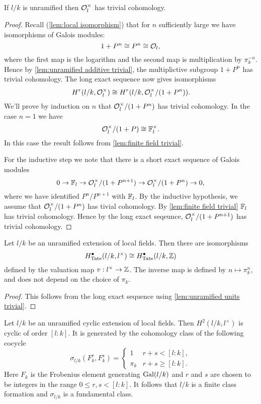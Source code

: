 \begin{lemma}	\label{lem:unramified units trivial}
	If $l/k$ is unramified then ${\mathcal O}_l^\times$ has trivial cohomology.
\end{lemma}

\begin{proof}
	Recall (\ref{lem:local isomorphism}) that for $n$ sufficiently large we have isomorphisms of
	Galois modules:
	\[
		1 + P^n \cong P^n \cong {\mathcal O}_l,
	\]
	where the first map is the logarithm and the second map is multiplication by $\pi_k^{-n}$.
	Hence by \ref{lem:unramified additive trivial}, the multiplictive subgroup $1+P^n$ has trivial
	cohomology.
	The long exact sequence now gives isomorphisms
	\[
		H^r(l/k,{\mathcal O}_l^\times) \cong H^r(l/k,{\mathcal O}_l^\times / (1+P^n)).
	\]
	We'll prove by induction on $n$ that ${\mathcal O}_l^\times / (1+P^n)$ has trivial cohomology.
	In the case $n = 1$ we have
	\[
		{\mathcal O}_l^\times / (1+P) \cong {\mathbb F}_l^\times.
	\]
	In this case the result follows from \ref{lem:finite field trivial}.

	For the inductive step we note that there is a short exact sequence of Galois modules
	\[
		0 \to {\mathbb F}_l \to  {\mathcal O}_l^\times / (1+P^{n+1})  \to{\mathcal O}_l^\times / (1+P^n)  \to  0,
	\]
	where we have identified $P^n / P^{n+1}$ with ${\mathbb F}_l$.
	By the inductive hypothesis, we assume that ${\mathcal O}_l^\times / (1+P^n)$ has tivial cohomology.
	By \ref{lem:finite field trivial} ${\mathbb F}_l$ has trivial cohomology.
	Hence by the long exact seqeunce, ${\mathcal O}_l^\times / (1+P^{n+1})$ has trivial cohomology.
\end{proof}


\begin{corollary} \label{cor:cohomology unramified iso cohomology Z}
	Let $l/k$ be an unramified extension of local fields.
	Then there are isomorphisms
	\[
		H^\bullet_{\mathrm{Tate}}(l/k,l^\times) \cong H^\bullet_{\mathrm{Tate}} (l/k,{\mathbb Z})
	\]
	defined by the valuation map $v : l^\times \to {\mathbb Z}$.
	The inverse map is defined by $n \mapsto \pi_k^n$, and does not depend on the choice of $\pi_k$.
\end{corollary}

\begin{proof}
	This follows from the long exact sequence using \ref{lem:unramified units trivial}.
\end{proof}


\begin{lemma} \label{lem:unrammified fundamental class}
	Let $l/k$ be an unramified cyclic extension of local fields.
	Then $H^2(l/k,l^\times)$ is cyclic of order $[l:k]$.
	It is generated by the cohomology class of the following cocycle
	\[
		\sigma_{l/k} (F_k^r, F_k^s) =
		\begin{cases}
			1 & r + s < [l:k], \\
			\pi_k & r + s \ge [l:k].
		\end{cases}
	\]
	Here $F_k$ is the Frobenius element generating $\mathrm{Gal}(l/k)$ and $r$ and $s$
	are chosen to be integers in the range $0 \le r,s <[l:k]$.
	It follows that $l / k$ is a finite class formation and $\sigma_{l/k}$ is a fundamental class.
\end{lemma}

